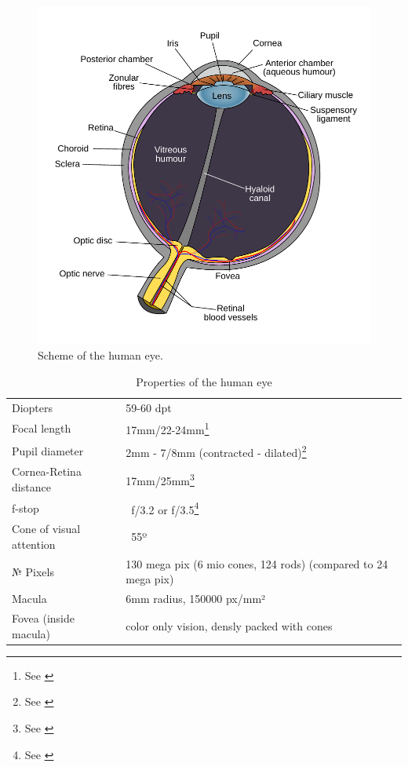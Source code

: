 \documentclass{acm_proc_article-sp}
\begin{document}
\begin{figure}
    \centering
    \includegraphics[width=\columnwidth]{human_eye_scheme.pdf}
    \caption{Scheme of the human eye.}
    \label{fig:humaneye}
\end{figure}

\begin{table}
    \centering
    \begin{tabular}{ll}
        Diopters                & 59-60 dpt \\
        Focal length            & 17mm/22-24mm\footnote{See \cite{eye-focal, eyeascamera}} \\
        Pupil diameter          & 2mm - 7/8mm (contracted - dilated)\footnote{See \cite{eyeascamera}} \\
        Cornea-Retina distance  & 17mm/25mm\footnote{See \cite{eyeascamera}} \\
        f-stop                  & ~f/3.2 or f/3.5\footnote{See \cite{eyeascamera}} \\
        Cone of visual attention& ~55º \\
        № Pixels                & 130 mega pix (6 mio cones, 124 rods) (compared to 24 mega pix) \\
        Macula                  & 6mm radius, 150000 px/mm²\\
        Fovea (inside macula)   & color only vision, densly packed with cones \\
    \end{tabular}
    \caption{Properties of the human eye}
    \label{tab:eyeproperties}
\end{table}
\end{document}
